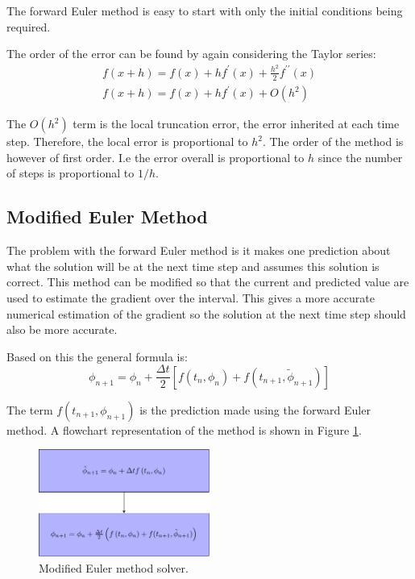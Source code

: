 \documentclass[../Interim_Report_Master]{subfiles}
\begin{document}
The forward Euler method is easy to start with only the initial conditions being required.

The order of the error can be found by again considering the Taylor series:
\begin{subequations}
\begin{eqnarray}
f(x+h) = f(x)+hf^\prime(x)+\frac{h^2}{2}f^{\prime\prime}(x) \\
f(x+h) = f(x)+hf^\prime(x)+O(h^2)
\end{eqnarray}
\end{subequations}

The $O(h^2)$ term is the local truncation error, the error inherited at each time step. Therefore, the local error is proportional to $h^2$. The order of the method is however of first order. I.e the error overall is proportional to $h$ since the number of steps is proportional to $1/h$. 

\subsection{Modified Euler Method}
The problem with the forward Euler method is it makes one prediction about what the solution will be at the next time step and assumes this solution is correct. This method can be modified so that the current and predicted value are used to estimate the gradient over the interval. This gives a more accurate numerical estimation of the gradient so the solution at the next time step should also be more accurate. 

Based on this the general formula is:
\begin{equation}
\phi_{n+1} = \phi_n+\frac{\Delta t}{2}\left[f(t_n,\phi_n)+f(t_{n+1},\tilde{\phi}_{n+1})\right]
\end{equation}

The term $f(t_{n+1},\phi_{n+1})$ is the prediction made using the forward Euler method. A flowchart representation of the method is shown in Figure \ref{mod_euler}. 
\begin{figure}
	\centering
	\includegraphics[width=0.5\textwidth]{./Diagrams/Modified_Euler_Method_Flowchart/Modified_Euler_Method_Flowchart.pdf}
	\caption{Modified Euler method solver.}
	\label{mod_euler}
\end{figure}
\end{document}
